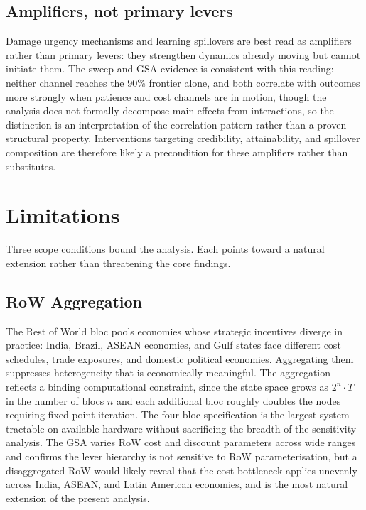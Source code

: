 \documentclass[10pt,a4paper]{article}
\begin{document}
\needspace{4em}
\subsection{Amplifiers, not primary levers}

Damage urgency mechanisms and learning spillovers are best read as amplifiers rather than primary
levers: they strengthen dynamics already moving but cannot initiate them. The sweep and GSA
evidence is consistent with this reading: neither channel reaches the 90\% frontier alone, and
both correlate with outcomes more strongly when patience and cost channels are in motion, though
the analysis does not formally decompose main effects from interactions, so the distinction is an
interpretation of the correlation pattern rather than a proven structural property. Interventions
targeting credibility, attainability, and spillover composition are therefore likely a precondition
for these amplifiers rather than substitutes.

\clearpage
\needspace{12em}
\section{Limitations}

Three scope conditions bound the analysis. Each points toward a natural extension rather than threatening
the core findings.

\subsection{RoW Aggregation}

The Rest of World bloc pools economies whose strategic incentives diverge in practice: India, Brazil, ASEAN economies, and Gulf states face different cost schedules, trade exposures, and domestic political economies. Aggregating them suppresses heterogeneity that is economically meaningful. The aggregation reflects a binding computational constraint, since the state space grows as $2^n \cdot T$ in the number of blocs $n$ and each additional bloc roughly doubles the nodes requiring fixed-point iteration. The four-bloc specification is the largest system tractable on available hardware without sacrificing the breadth of the sensitivity analysis. The GSA varies RoW cost and discount parameters across wide ranges and confirms the lever hierarchy is not sensitive to RoW parameterisation, but a disaggregated RoW would likely reveal that the cost bottleneck applies unevenly across India, ASEAN, and Latin American economies, and is the most natural extension of the present analysis.
\end{document}
